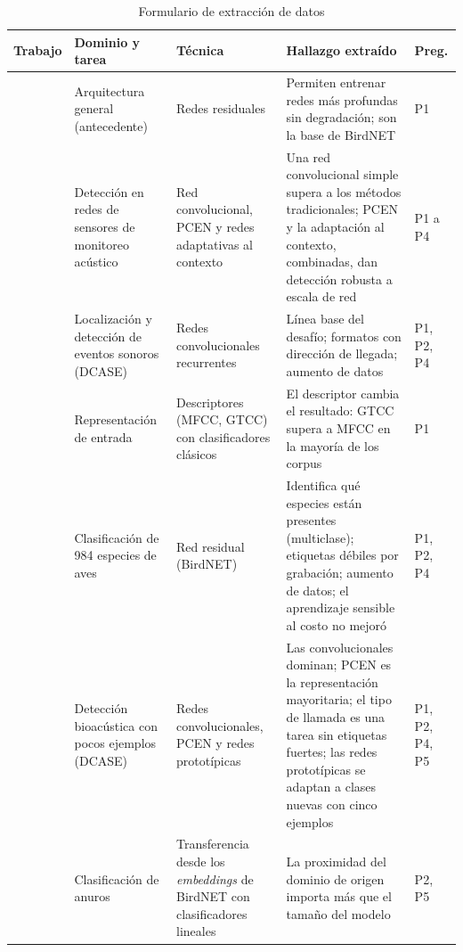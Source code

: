 \begin{table}[htbp]
    \centering
    \caption{Formulario de extracción de datos}
    \label{tab:formulario}
    \footnotesize
    \begin{tabular}{@{}L{2.6cm}L{2.8cm}L{2.9cm}L{4.4cm}L{1.2cm}@{}}
        \toprule
        \textbf{Trabajo} & \textbf{Dominio y tarea} & \textbf{Técnica} & \textbf{Hallazgo extraído} & \textbf{Preg.} \\
        \midrule
        \citet{he_deep_2016} & Arquitectura general (antecedente) & Redes residuales & Permiten entrenar redes más profundas sin degradación; son la base de BirdNET & P1 \\
        \addlinespace
        \citet{lostanlen_robust_2019} & Detección en redes de sensores de monitoreo acústico & Red convolucional, PCEN y redes adaptativas al contexto & Una red convolucional simple supera a los métodos tradicionales; PCEN y la adaptación al contexto, combinadas, dan detección robusta a escala de red & P1 a P4 \\
        \addlinespace
        \citet{politis_dataset_2020} & Localización y detección de eventos sonoros (DCASE) & Redes convolucionales recurrentes & Línea base del desafío; formatos con dirección de llegada; aumento de datos & P1, P2, P4 \\
        \addlinespace
        \citet{bonet-sola_comparative_2021} & Representación de entrada & Descriptores (MFCC, GTCC) con clasificadores clásicos & El descriptor cambia el resultado: GTCC supera a MFCC en la mayoría de los corpus & P1 \\
        \addlinespace
        \citet{kahl_birdnet_2021} & Clasificación de 984 especies de aves & Red residual (BirdNET) & Identifica qué especies están presentes (multiclase); etiquetas débiles por grabación; aumento de datos; el aprendizaje sensible al costo no mejoró & P1, P2, P4 \\
        \addlinespace
        \citet{nolasco_learning_2023} & Detección bioacústica con pocos ejemplos (DCASE) & Redes convolucionales, PCEN y redes prototípicas & Las convolucionales dominan; PCEN es la representación mayoritaria; el tipo de llamada es una tarea sin etiquetas fuertes; las redes prototípicas se adaptan a clases nuevas con cinco ejemplos & P1, P2, P4, P5 \\
        \addlinespace
        \citet{kath_leveraging_2024} & Clasificación de anuros & Transferencia desde los \textit{embeddings} de BirdNET con clasificadores lineales & La proximidad del dominio de origen importa más que el tamaño del modelo & P2, P5 \\

\end{tabular}
\end{table}
